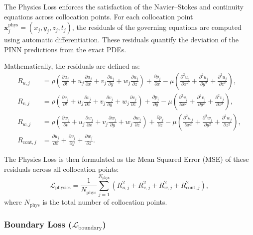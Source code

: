 \documentclass[12pt, a4paper]{article}
\begin{document}
The Physics Loss enforces the satisfaction of the Navier--Stokes and continuity equations across collocation points. For each collocation point $\mathbf{x}_j^{\mathrm{phys}} = (x_j, y_j, z_j, t_j)$, the residuals of the governing equations are computed using automatic differentiation. These residuals quantify the deviation of the PINN predictions from the exact PDEs.

Mathematically, the residuals are defined as:
\begin{align}
R_{u,j} &= \rho \left( \frac{\partial u_j}{\partial t} + u_j \frac{\partial u_j}{\partial x} + v_j \frac{\partial u_j}{\partial y} + w_j \frac{\partial u_j}{\partial z} \right) + \frac{\partial p_j}{\partial x} - \mu \left( \frac{\partial^2 u_j}{\partial x^2} + \frac{\partial^2 u_j}{\partial y^2} + \frac{\partial^2 u_j}{\partial z^2} \right), \\
R_{v,j} &= \rho \left( \frac{\partial v_j}{\partial t} + u_j \frac{\partial v_j}{\partial x} + v_j \frac{\partial v_j}{\partial y} + w_j \frac{\partial v_j}{\partial z} \right) + \frac{\partial p_j}{\partial y} - \mu \left( \frac{\partial^2 v_j}{\partial x^2} + \frac{\partial^2 v_j}{\partial y^2} + \frac{\partial^2 v_j}{\partial z^2} \right), \\
R_{w,j} &= \rho \left( \frac{\partial w_j}{\partial t} + u_j \frac{\partial w_j}{\partial x} + v_j \frac{\partial w_j}{\partial y} + w_j \frac{\partial w_j}{\partial z} \right) + \frac{\partial p_j}{\partial z} - \mu \left( \frac{\partial^2 w_j}{\partial x^2} + \frac{\partial^2 w_j}{\partial y^2} + \frac{\partial^2 w_j}{\partial z^2} \right), \\
R_{\mathrm{cont},j} &= \frac{\partial u_j}{\partial x} + \frac{\partial v_j}{\partial y} + \frac{\partial w_j}{\partial z}.
\end{align}

The Physics Loss is then formulated as the Mean Squared Error (MSE) of these residuals across all collocation points:
\begin{equation}
\mathcal{L}_{\mathrm{physics}} = \frac{1}{N_{\mathrm{phys}}} \sum_{j=1}^{N_{\mathrm{phys}}} \left( R_{u,j}^2 + R_{v,j}^2 + R_{w,j}^2 + R_{\mathrm{cont},j}^2 \right),
\end{equation}
where $N_{\mathrm{phys}}$ is the total number of collocation points.

\subsubsection{Boundary Loss ($\mathcal{L}_{\mathrm{boundary}}$)}
\end{document}
